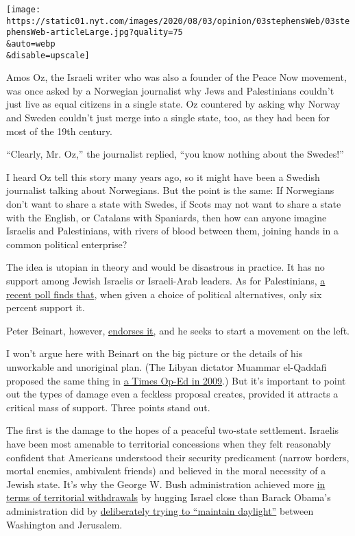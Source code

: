 \texttt{[image: https://static01.nyt.com/images/2020/08/03/opinion/03stephensWeb/03stephensWeb-articleLarge.jpg?quality=75\\\&auto=webp\\\&disable=upscale]}

Amos Oz, the Israeli writer who was also a founder of the Peace Now
movement, was once asked by a Norwegian journalist why Jews and
Palestinians couldn't just live as equal citizens in a single state. Oz
countered by asking why Norway and Sweden couldn't just merge into a
single state, too, as they had been for most of the 19th century.

``Clearly, Mr. Oz,'' the journalist replied, ``you know nothing about
the Swedes!''

I heard Oz tell this story many years ago, so it might have been a
Swedish journalist talking about Norwegians. But the point is the same:
If Norwegians don't want to share a state with Swedes, if Scots may not
want to share a state with the English, or Catalans with Spaniards, then
how can anyone imagine Israelis and Palestinians, with rivers of blood
between them, joining hands in a common political enterprise?

The idea is utopian in theory and would be disastrous in practice. It
has no support among Jewish Israelis or Israeli-Arab leaders. As for
Palestinians,
\href{http://pcpsr.org/sites/default/files/Poll\%2076\%20English\%20press\%20release\%20\%D9\%8D_June\%202020.pdf}{a
recent poll finds that}, when given a choice of political alternatives,
only six percent support it.

Peter Beinart, however,
\href{https://www.nytimes.com/2020/07/08/opinion/israel-annexation-two-state-solution.html}{endorses
it,} and he seeks to start a movement on the left.

I won't argue here with Beinart on the big picture or the details of his
unworkable and unoriginal plan. (The Libyan dictator Muammar el-Qaddafi
proposed the same thing in
\href{https://www.nytimes.com/2009/01/22/opinion/22qaddafi.html}{a Times
Op-Ed in 2009}.) But it's important to point out the types of damage
even a feckless proposal creates, provided it attracts a critical mass
of support. Three points stand out.

The first is the damage to the hopes of a peaceful two-state settlement.
Israelis have been most amenable to territorial concessions when they
felt reasonably confident that Americans understood their security
predicament (narrow borders, mortal enemies, ambivalent friends) and
believed in the moral necessity of a Jewish state. It's why the George
W. Bush administration achieved more
\href{https://www.nytimes.com/2005/08/14/nyregion/pain-of-israels-withdrawal-from-gaza-strip-is-felt-by-american.html}{in
terms of territorial withdrawals} by hugging Israel close than Barack
Obama's administration did by
\href{https://www.wsj.com/articles/how-obama-abandoned-israel-1434409772}{deliberately
trying to ``maintain daylight''} between Washington and Jerusalem.

